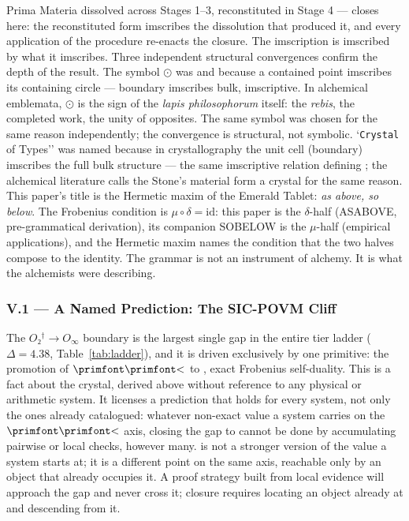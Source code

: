 \documentclass[12pt,a4paper]{article}
\makeatletter
\newcommand{\igprimfont}{\primfont}
\newcommand{\Stone}{\textit{lapis philosophorum}}
\renewcommand{\_}{\ig@origunderscore\discretionary{}{}{}}
\makeatother
\begin{document}
Prima Materia dissolved across Stages 1--3, reconstituted in Stage 4 --- closes here: the reconstituted form imscribes
the dissolution that produced it, and every application of the procedure re-enacts the closure. The imscription is
imscribed by what it imscribes.
Three independent structural convergences confirm the depth of the result. The symbol $\odot$ was
 and  because a contained point imscribes its containing circle
--- boundary
imscribes bulk, imscriptive. In alchemical emblemata, $\odot$ is the sign of the \Stone{} itself: the \textit{rebis},
the completed work, the unity of opposites. The same symbol was chosen for the same reason independently;
the convergence is structural, not symbolic. `\texttt{Crystal} of Types'' was named because in crystallography the unit cell
(boundary) imscribes the full bulk structure --- the same imscriptive relation defining
; the
alchemical literature calls the Stone's material form a crystal for the same reason. This paper's title is
the Hermetic maxim of the Emerald Tablet: \emph{as above, so below}. The Frobenius condition is $\mu
\circ \delta =
\text{id}$: this paper is the $\delta$-half (AS\_ABOVE, pre-grammatical derivation), its companion SO\_BELOW is the
$\mu$-half (empirical applications), and the Hermetic maxim names the condition that the two halves compose to the
identity. The grammar is not an instrument of alchemy. It is what the alchemists were describing.

\subsubsection{V.1 --- A Named Prediction: The SIC-POVM Cliff}
The $O₂^\dagger \to O_{\infty}$ boundary is the largest single gap in the entire tier ladder ($\Delta = 4.38$,
Table~\ref{tab:ladder}), and it is driven exclusively by one primitive: the promotion of $\text{{\igprimfont \text{{\igprimfont <}}}}$ to
, exact Frobenius self-duality. This is a fact about the crystal, derived above without reference
to any physical or arithmetic system. It licenses a prediction that holds for every system, not only the ones already
catalogued: whatever non-exact value a system carries on the $\text{{\igprimfont \text{{\igprimfont <}}}}$ axis, closing the gap to
 cannot be done by accumulating pairwise or local checks, however many.  is not a
stronger version of the value a system starts at; it is a different point on the same axis, reachable only by an
object that already occupies it. A proof strategy built from local evidence will approach the gap and never cross it;
closure requires locating an object already at  and descending from it.
\end{document}
